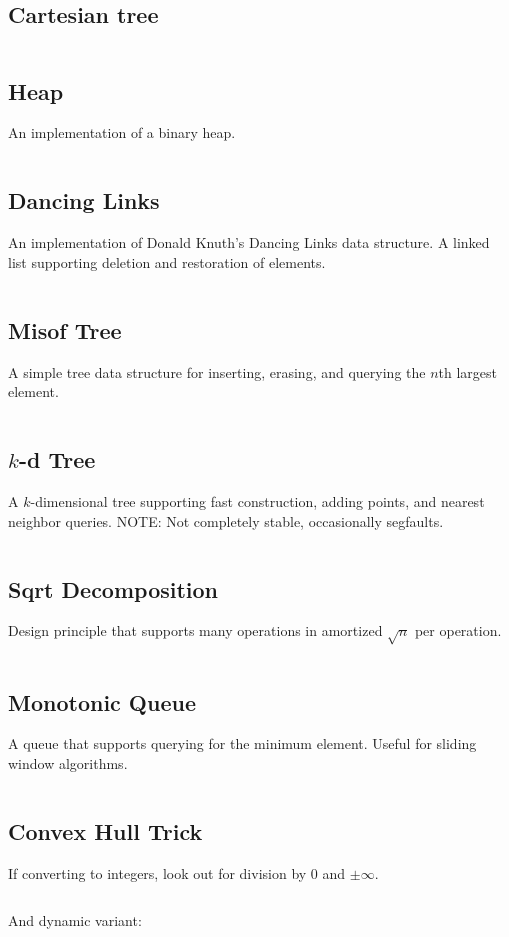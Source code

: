 \documentclass[8pt,a4paper,landscape,oneside]{amsart}
\newcommand{\code}[1]{\inputminted[fontsize=\normalsize,baselinestretch=1,breaklines,tabsize=2]{cpp}{code/#1}}
\begin{document}
\begin{multicols*}{3}
\subsection{Cartesian tree}
\code{datastructures/cartesian_tree.cpp}

\subsection{Heap}
	An implementation of a binary heap.
	\code{datastructures/heap.cpp}

\subsection{Dancing Links}
	An implementation of Donald Knuth's Dancing Links data structure. A
	linked list supporting deletion and restoration of elements.
	\code{datastructures/dancing_links.cpp}

\subsection{Misof Tree}
	A simple tree data structure for inserting, erasing, and querying the
	$n$th largest element.
	\code{datastructures/misof_tree.cpp}

\subsection{$k$-d Tree}
	A $k$-dimensional tree supporting fast construction, adding points, and
	nearest neighbor queries.
	NOTE: Not completely stable, occasionally segfaults.
	\code{datastructures/kd_tree.cpp}

\subsection{Sqrt Decomposition}
	Design principle that supports many operations in amortized $\sqrt{n}$ per operation.
	\code{datastructures/sqrt_decomposition.cpp}

\subsection{Monotonic Queue}
	A queue that supports querying for the minimum element. Useful for sliding window algorithms.
	\code{datastructures/monotonic_queue.cpp}

\subsection{Convex Hull Trick}
	If converting to integers, look out for division by 0 and $\pm\infty$.
	\code{datastructures/convex_hull_trick.cpp}
	And dynamic variant:
	\code{datastructures/convex_hull_trick_dynamic.cpp}


\end{multicols*}
\end{document}
